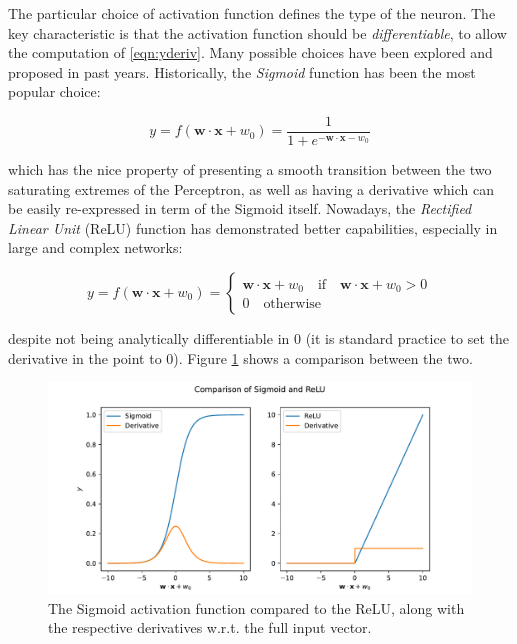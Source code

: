 The particular choice of activation function defines the type of the neuron. The key characteristic is that the activation function should be \emph{differentiable}, to allow the computation of \eqref{eqn:yderiv}. Many possible choices have been explored and proposed in past years.
Historically, the \emph{Sigmoid} function has been the most popular choice:

\[
y=f(\mathbf{w}\cdot\mathbf{x} + w_0) = \frac{1}{1 + e^{-\mathbf{w}\cdot\mathbf{x} - w_0}}
\]

which has the nice property of presenting a smooth transition between the two saturating extremes of the Perceptron, as well as having a derivative which can be easily re-expressed in term of the Sigmoid itself. Nowadays, the \emph{Rectified Linear Unit} (ReLU) function has demonstrated better capabilities, especially in large and complex networks:

\[
y=f(\mathbf{w}\cdot\mathbf{x} + w_0) = 
\begin{cases}
\mathbf{w}\cdot\mathbf{x} + w_0 \quad \text{if} \quad \mathbf{w}\cdot\mathbf{x} + w_0 > 0 \\
0 \quad \text{otherwise}
\end{cases}
\]

despite not being analytically differentiable in $0$ (it is standard practice to set the derivative in the point to $0$). Figure \ref{fig:actfunc} shows a comparison between the two.

\begin{figure}
    \centering
    \includegraphics[scale=0.50]{gfx/ch2/activ.pdf}
    \caption[Activation functions]{The Sigmoid activation function compared to the ReLU, along with the respective derivatives w.r.t. the full input vector.}
    \label{fig:actfunc}
\end{figure}

